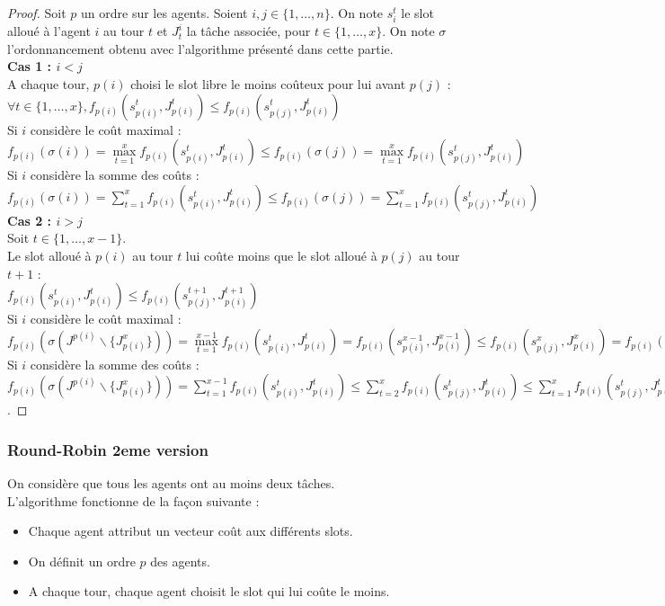 \documentclass[12pt]{article}
\theoremstyle{definition}
\begin{document}
\begin{proof}
Soit $p$ un ordre sur les agents. Soient $i, j \in \{1, \dots, n\}$. On note $s_i^t$ le slot alloué à l'agent $i$ au tour $t$ et $J^i_t$ la tâche associée, pour $t\in\{1,\dots,x\}$. On note $\sigma$ l'ordonnancement obtenu avec l'algorithme présenté dans cette partie.\\
\textbf{Cas 1 : $i<j$}\\
A chaque tour, $p(i)$ choisi le slot libre le moins coûteux pour lui avant $p(j)$ :\\
 $\forall t\in \{1, \dots, x\}, f_{p(i)}(s^t_{p(i)}, J^t_{p(i)})\leq f_{p(i)}(s^t_{p(j)}, J^t_{p(i)})$\\
 Si $i$ considère le coût maximal : $f_{p(i)}(\sigma(i)) = \max\limits_{t = 1}^x f_{p(i)}(s^t_{p(i)}, J^t_{p(i)}) \leq f_{p(i)}(\sigma(j)) = \max\limits_{t = 1}^x f_{p(i)}(s^t_{p(j)}, J^t_{p(i)})$\\
 Si $i$ considère la somme des coûts : $f_{p(i)}(\sigma(i)) = \sum\limits_{t = 1}^x f_{p(i)}(s^t_{p(i)}, J^t_{p(i)})\leq f_{p(i)}(\sigma(j)) = \sum\limits_{t = 1}^x f_{p(i)}(s^t_{p(j)}, J^t_{p(i)})$\\
\textbf{Cas 2 : $i>j$}\\
Soit $t\in\{1,\dots,x-1\}$.\\
Le slot alloué à $p(i)$ au tour $t$ lui coûte moins que le slot alloué à $p(j)$ au tour $t+1$ : \\
$f_{p(i)}(s^t_{p(i)}, J^t_{p(i)})\leq f_{p(i)}(s^{t+1}_{p(j)}, J^{t+1}_{p(i)})$\\
Si $i$ considère le coût maximal : \\
$f_{p(i)}(\sigma(J^{p(i)}\backslash\{J_{p(i)}^x\})) = \max\limits_{t = 1}^{x-1} f_{p(i)}(s^t_{p(i)}, J^t_{p(i)}) = f_{p(i)}(s^{x-1}_{p(i)}, J^{x-1}_{p(i)}) \leq f_{p(i)}(s^x_{p(j)}, J^x_{p(i)}) = f_{p(i)}(\sigma(j))$\\
Si $i$ considère la somme des coûts : \\
$f_{p(i)}(\sigma(J^{p(i)}\backslash\{J_{p(i)}^x\})) = \sum\limits_{t = 1}^{x-1} f_{p(i)}(s^t_{p(i)}, J^t_{p(i)}) \leq \sum\limits_{t = 2}^{x} f_{p(i)}(s^t_{p(j)}, J^t_{p(i)}) \leq \sum\limits_{t = 1}^{x} f_{p(i)}(s^t_{p(j)}, J^t_{p(i)}) = f_{p(i)}(\sigma(j))$.
\end{proof}

\subsubsection{Round-Robin 2eme version}
\noindent
On considère que tous les agents ont au moins deux tâches.\\
L'algorithme fonctionne de la façon suivante :
\begin{itemize}
	\item Chaque agent attribut un vecteur coût aux différents slots.
	\item On définit un ordre $p$ des agents.
	\item A chaque tour, chaque agent choisit le slot qui lui coûte le moins.
\end{itemize}
\end{document}
